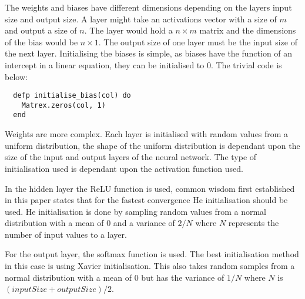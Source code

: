 The weights and biases have different dimensions depending on the layers input
size and output size. A layer might take an activations vector with a size of
\(m\) and output a size of \(n\). The layer would hold a \(n \times m\) matrix
and the dimensions of the bias would be \(n \times 1\). The output size of one
layer must be the input size of the next layer. Initialising the biases is
simple, as biases have the function of an intercept in a linear equation, they
can be initialised to 0. The trivial code is below:
\begin{lstlisting}
  defp initialise_bias(col) do
    Matrex.zeros(col, 1)
  end
\end{lstlisting} 
Weights are more complex. Each layer is initialised with random values from a
uniform distribution, the shape of the uniform distribution is dependant upon
the size of the input and output layers of the neural network. The type of
initialisation used is dependant upon the activation function used.

In the hidden layer the ReLU function is used, common wisdom first established
in this paper \cite{he2015delving} states that for the fastest convergence He
initialisation should be used. He initialisation is done by sampling random
values from a normal distribution with a mean of 0 and a variance of \( 2/N \)
where \(N\) represents the number of input values to a layer.

For the output layer, the softmax function is used. The best initialisation
method in this case is using Xavier
initialisation. \cite{glorot2010understanding} This also takes random samples
from a normal distribution with a mean of 0 but has the variance of \( 1/N \)
where \(N\) is \( (inputSize + outputSize) / 2 \).

